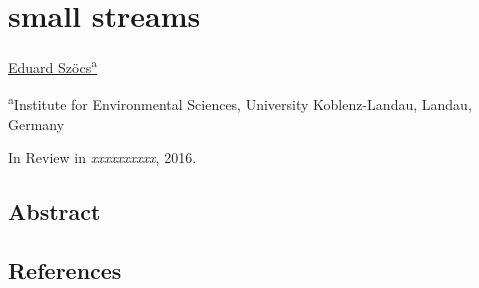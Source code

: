 \chapter{small streams}
\label{sec:smallstreams}  

\begin{sloppypar}
\bigskip
\underline{Eduard Szöcs\textsuperscript{a}}

\bigskip
\small
\noindent 
\textsuperscript{a}Institute for Environmental Sciences, University Koblenz-Landau, Landau, Germany 

\bigskip 
\normalsize
\noindent
In Review in \emph{xxxxxxxxxx}, 2016.

\end{sloppypar}
\newpage


\section{Abstract}



\section{References}
\printbibliography[heading=none]
